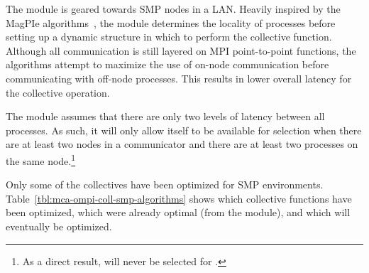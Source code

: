 The  module is geared towards SMP nodes in a LAN.  Heavily
inspired by the MagPIe
algorithms~\cite{kielmann++:00:magpie_bandwidth}, the 
module determines the locality of processes before setting up a
dynamic structure in which to perform the collective function.
Although all communication is still layered on MPI point-to-point
functions, the algorithms attempt to maximize the use of on-node
communication before communicating with off-node processes.  This
results in lower overall latency for the collective operation.  

The  module assumes that there are only two levels of
latency between all processes.  As such, it will only allow itself to
be available for selection when there are at least two nodes in a
communicator and there are at least two processes on the same
node.\footnote{As a direct result,  will never be selected
  for \mcs.}

Only some of the collectives have been optimized for SMP environments.
Table~\ref{tbl:mca-ompi-coll-smp-algorithms} shows which collective
functions have been optimized, which were already optimal (from the
 module), and which will eventually be optimized.

\def\lbid{Identical to \coll{lam\_\-basic} algorithm; already
  optimized for SMP environments.}
\def\smpopt{Optimized for SMP environments.}
\def\smpnoopt{Not yet optimized for SMP environments; uses
  \coll{lam\_\-basic} algorithm instead.}

